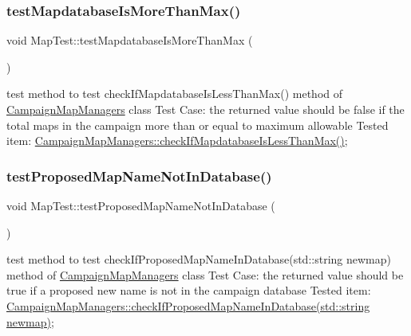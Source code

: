 \subsubsection{\texorpdfstring{test\+Mapdatabase\+Is\+More\+Than\+Max()}{testMapdatabaseIsMoreThanMax()}}
{\footnotesize\ttfamily void Map\+Test\+::test\+Mapdatabase\+Is\+More\+Than\+Max (\begin{DoxyParamCaption}{ }\end{DoxyParamCaption})\hspace{0.3cm}{\ttfamily [protected]}}

test method to test check\+If\+Mapdatabase\+Is\+Less\+Than\+Max() method of \hyperlink{class_campaign_map_managers}{Campaign\+Map\+Managers} class Test Case\+: the returned value should be false if the total maps in the campaign more than or equal to maximum allowable Tested item\+: \hyperlink{class_campaign_map_managers_ab68ada5bdef5137358cb80c0ad732b79}{Campaign\+Map\+Managers\+::check\+If\+Mapdatabase\+Is\+Less\+Than\+Max()}; \hypertarget{class_map_test_adb1babd418a102b71ebd712fbff3a3d3}{}\label{class_map_test_adb1babd418a102b71ebd712fbff3a3d3} 
\subsubsection{\texorpdfstring{test\+Proposed\+Map\+Name\+Not\+In\+Database()}{testProposedMapNameNotInDatabase()}}
{\footnotesize\ttfamily void Map\+Test\+::test\+Proposed\+Map\+Name\+Not\+In\+Database (\begin{DoxyParamCaption}{ }\end{DoxyParamCaption})\hspace{0.3cm}{\ttfamily [protected]}}

test method to test check\+If\+Proposed\+Map\+Name\+In\+Database(std\+::string newmap) method of \hyperlink{class_campaign_map_managers}{Campaign\+Map\+Managers} class Test Case\+: the returned value should be true if a proposed new name is not in the campaign database Tested item\+: \hyperlink{class_campaign_map_managers_a6e04b8ac8bbc2872bb0441428e0042b3}{Campaign\+Map\+Managers\+::check\+If\+Proposed\+Map\+Name\+In\+Database(std\+::string newmap)}; \hypertarget{class_map_test_ae7a28d196c97101aa248a326af2a3f5b}{}\label{class_map_test_ae7a28d196c97101aa248a326af2a3f5b} 
